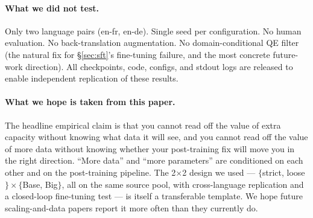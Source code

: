 \paragraph{What we did not test.}
Only two language pairs (en-fr, en-de). Single seed per configuration. No human evaluation. No back-translation augmentation. No domain-conditional QE filter (the natural fix for \S\ref{sec:sft}'s fine-tuning failure, and the most concrete future-work direction). All checkpoints, code, configs, and stdout logs are released to enable independent replication of these results.

\paragraph{What we hope is taken from this paper.}
The headline empirical claim is that you cannot read off the value of extra capacity without knowing what data it will see, and you cannot read off the value of more data without knowing whether your post-training fix will move you in the right direction. ``More data'' and ``more parameters'' are conditioned on each other and on the post-training pipeline. The 2$\times$2 design we used --- $\{$strict, loose$\} \times \{$Base, Big$\}$, all on the same source pool, with cross-language replication and a closed-loop fine-tuning test --- is itself a transferable template. We hope future scaling-and-data papers report it more often than they currently do.
